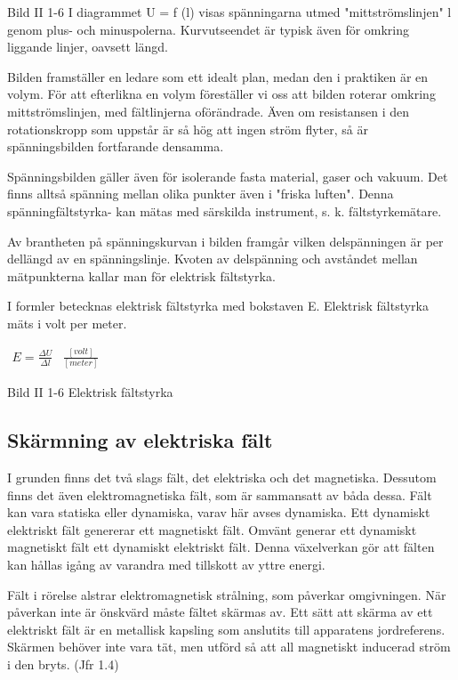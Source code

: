 Bild II 1-6
I diagrammet U = f (l) visas spänningarna utmed "mittströmslinjen" l genom plus- och
minuspolerna. Kurvutseendet är typisk även för omkring liggande linjer, oavsett längd.

Bilden framställer en ledare som ett idealt plan, medan den i praktiken är en volym.
För att efterlikna en volym föreställer vi oss att bilden roterar omkring
mittströmslinjen, med fältlinjerna oförändrade. Även om resistansen i den rotationskropp
som uppstår är så hög att ingen ström flyter, så är spänningsbilden fortfarande densamma.

Spänningsbilden gäller även för isolerande fasta material, gaser och vakuum.
Det finns alltså spänning mellan olika punkter även i "friska luften". Denna
spänningfältstyrka- kan mätas med särskilda instrument, s. k. fältstyrkemätare.

Av brantheten på spänningskurvan i bilden framgår vilken delspänningen är per dellängd av
en spänningslinje. Kvoten av delspänning och avståndet mellan mätpunkterna kallar man för
elektrisk fältstyrka.

I formler betecknas elektrisk fältstyrka med bokstaven E.
Elektrisk fältstyrka mäts i volt per meter.

$
\begin{array}{cc}
E=\frac{\Delta U}{\Delta l} & \frac{[volt]}{[meter]}
\end{array}
$

Bild II 1-6 Elektrisk fältstyrka

\subsection{Skärmning av elektriska fält}

I grunden finns det två slags fält, det elektriska och det magnetiska. Dessutom finns det
även elektromagnetiska fält, som är sammansatt av båda dessa. Fält kan vara statiska
eller dynamiska, varav här avses dynamiska. Ett dynamiskt elektriskt fält genererar ett
magnetiskt fält. Omvänt generar ett dynamiskt magnetiskt fält ett dynamiskt elektriskt
fält. Denna växelverkan gör att fälten kan hållas igång av varandra med tillskott av
yttre energi.

Fält i rörelse alstrar elektromagnetisk strålning, som påverkar omgivningen. När
påverkan inte är önskvärd måste fältet skärmas av. Ett sätt att skärma av ett elektriskt
fält är en metallisk kapsling som anslutits till apparatens jordreferens. Skärmen behöver
inte vara tät, men utförd så att all magnetiskt inducerad ström i den bryts. (Jfr 1.4)
